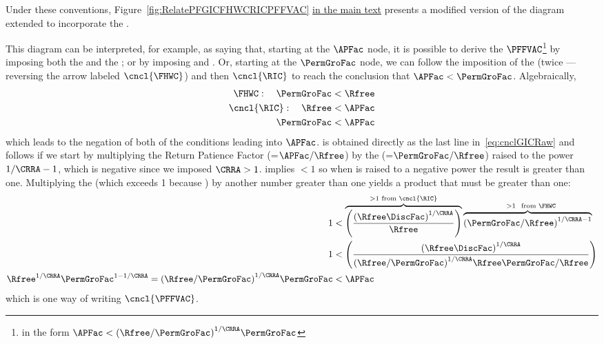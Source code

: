\documentclass[\econtexRoot/BufferStockTheory]{subfiles}
\begin{document}
Under these conventions, Figure~\ref{fig:RelatePFGICFHWCRICPFFVAC} \hyperlink{RelatePFGICFHWCRICPFFVAC}{in the main text} presents a modified version of the diagram extended to incorporate the {\PFFVAC}.

  

This diagram can be interpreted, for example, as saying  that, starting at the $\APFac$ node, it is possible to derive the $\PFFVAC$\footnote{in the form $\APFac < {(\Rfree/\PermGroFac)}^{1/\CRRA}\PermGroFac$} by imposing both the {\GICRaw} and the {\FHWC}; or by imposing {\RIC} and \cncl{\FHWC}.
Or, starting at the $\PermGroFac$ node, we can follow the imposition of the {\FHWC} (twice --- reversing the arrow labeled $\cncl{\FHWC}$) and then $\cncl{\RIC}$ to reach the conclusion that $\APFac < \PermGroFac$.
Algebraically,
\begin{equation}\begin{gathered}\begin{aligned}
  {\FHWC}:~~~ \PermGroFac & < \Rfree 
  \\ \cncl{\RIC}:~~~ \Rfree & < \APFac 
  \\ \PermGroFac & < \APFac \label{eq:cnclGICRaw}
\end{aligned}\end{gathered}\end{equation}
which leads to the negation of both of the conditions leading into $\APFac$.
\cncl{\GICRaw} is obtained directly as the last line in~\eqref{eq:cnclGICRaw} and \cncl{\PFFVAC} follows if we start by multiplying the Return Patience Factor ({\RPFacDefn}=$\APFac/\Rfree$) by the {\FHWFacDefn} (=$\PermGroFac/\Rfree$) raised to the power $1/\CRRA-1$, which is negative since we imposed $\CRRA > 1$.
{\FHWC} implies {\FHWFacDefn} $< 1$ so when {\FHWFacDefn} is raised to a negative power the result is greater than one.
Multiplying the {\RPFacDefn} (which exceeds 1 because \cncl{\RIC}) by another number greater than one yields a product that must be greater than one:
\begin{equation}\begin{gathered}\begin{aligned}
  1  & < \overbrace{\left(\frac{{(\Rfree \DiscFac)}^{1/\CRRA}}{\Rfree}\right)}^{>1 \text{~from~}\cncl{\RIC}}\overbrace{{\left(\PermGroFac/\Rfree\right)}^{1/\CRRA-1}}^{\phantom{\ldots}>1~\text{~from~} \FHWC} \notag
  \\ 1  & < \left(\frac{{(\Rfree \DiscFac)}^{1/\CRRA}}{{(\Rfree/\PermGroFac)}^{1/\CRRA}\Rfree\PermGroFac/\Rfree}\right) \label{eq:cnclFHWFacDefnAndcnclRICImplycnclPFFVAC}
  \\ \Rfree^{1/\CRRA}\PermGroFac^{1 - 1/\CRRA} = {(\Rfree/\PermGroFac)}^{1/\CRRA} \PermGroFac  & < \APFac \notag
\end{aligned}\end{gathered}\end{equation}
which is one way of writing $\cncl{\PFFVAC}$.
\end{document}
